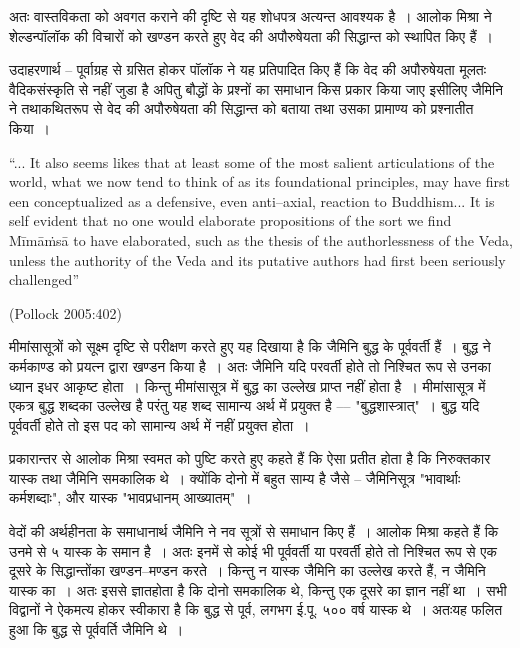 अतः वास्तविकता को अवगत कराने की दृष्टि से यह शोधपत्र अत्यन्त आवश्यक है~। आलोक मिश्रा ने शेल्डन्पॉलॉक की विचारों को खण्डन करते हुए वेद की अपौरुषेयता की सिद्धान्त को स्थापित किए हैं~।

उदाहरणार्थ – पूर्वाग्रह से ग्रसित होकर पॉलॉक ने यह प्रतिपादित किए हैं कि वेद की अपौरुषेयता मूलतः वैदिकसंस्कृति से नहीं जुडा है अपितु बौद्धों के प्रश्नों का समाधान किस प्रकार किया जाए इसीलिए जैमिनि ने तथाकथितरूप से वेद की अपौरुषेयता की सिद्धान्त को बताया तथा उसका प्रामाण्य को प्रश्नातीत किया~।

\begin{myquote}
“... It also seems likes that at least some of the most salient articulations of the world, what we now tend to think of as its foundational principles, may have first een conceptualized as a defensive, even anti–axial, reaction to Buddhism... It is self evident that no one would elaborate propositions of the sort we find Mīmāṁsā to have elaborated, such as the thesis of the authorlessness of the Veda, unless the authority of the Veda and its putative authors had first been seriously challenged”
\end{myquote}

\hfill (Pollock 2005:402)

मीमांसासूत्रों को सूक्ष्म दृष्टि से परीक्षण करते हुए यह दिखाया है कि जैमिनि बुद्ध के पूर्ववर्ती हैं~। बुद्ध ने कर्मकाण्ड को प्रयत्न द्वारा खण्डन किया है~। अतः जैमिनि यदि परवर्ती होते तो निश्चित रूप से उनका ध्यान इधर आकृष्ट होता~। किन्तु मीमांसासूत्र में बुद्ध का उल्लेख प्राप्त नहीं होता है~। मीमांसासूत्र में एकत्र बुद्ध शब्दका उल्लेख है परंतु यह शब्द सामान्य अर्थ में प्रयुक्त है –– "बुद्धशास्त्रात्"~। बुद्ध यदि पूर्ववर्ती होते तो इस पद को सामान्य अर्थ में नहीं प्रयुक्त होता~।

प्रकारान्तर से आलोक मिश्रा स्वमत को पुष्टि करते हुए कहते हैं कि ऐसा प्रतीत होता है कि निरुक्तकार यास्क तथा जैमिनि समकालिक थे~। क्योंकि दोनो में बहुत साम्य है जैसे – जैमिनिसूत्र "भावार्थाः कर्मशब्दाः", और यास्क "भावप्रधानम् आख्यातम्"~।

वेदों की अर्थहीनता के समाधानार्थ जैमिनि ने नव सूत्रों से समाधान किए हैं~। आलोक मिश्रा कहते हैं कि उनमे से ५ यास्क के समान है~। अतः इनमें से कोई भी पूर्ववर्ती या परवर्ती होते तो निश्चित रूप से एक दूसरे के सिद्धान्तोंका खण्डन–मण्डन करते~। किन्तु न यास्क जैमिनि का उल्लेख करते हैं, न जैमिनि यास्क का~। अतः इससे ज्ञातहोता है कि दोनो समकालिक थे, किन्तु एक दूसरे का ज्ञान नहीं था~। सभी विद्वानों ने ऐकमत्य होकर स्वीकारा है कि बुद्ध से पूर्व, लगभग ई.पू. ५०० वर्ष यास्क थे~। अतःयह फलित हुआ कि बुद्ध से पूर्ववर्ति जैमिनि थे~।

